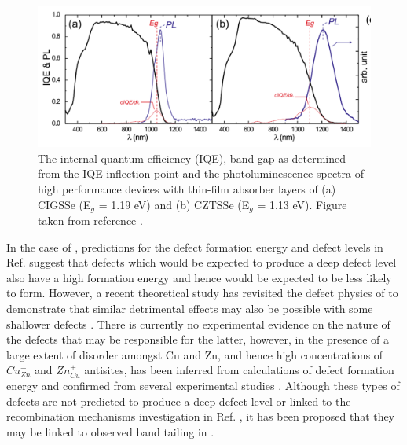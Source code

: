 \documentclass[11pt, twoside]{report}
\begin{document}
\begin{figure}[h!]
  \centering
    \includegraphics[width=1.0\textwidth]{figures/CZTS+CIGS_PL.png}
    \caption[The internal quantum efficiency (IQE), band gap as determined from the IQE inflection point and the photoluminescence spectra of high performance devices with thin-film absorber layers of (a) CIGSSe (E$_g$ = 1.19 eV) and (b) CZTSSe (E$_g$ = 1.13 eV).]{The internal quantum efficiency (IQE), band gap as determined from the IQE inflection point and the photoluminescence spectra of high performance devices with thin-film absorber layers of (a) CIGSSe (E$_g$ = 1.19 eV) and (b) CZTSSe (E$_g$ = 1.13 eV). Figure taken from reference .}
  \label{CZTS+CIGS_PL}
\end{figure}

In the case of {\CZTS}, predictions for the defect formation energy and defect levels in Ref.  suggest that defects which would be expected to produce a deep defect level also have a high formation energy and hence would be expected to be less likely to form.
However, a recent theoretical study has revisited the defect physics of {\CZTS} to demonstrate that similar detrimental effects may also be possible with some shallower defects \cite{Sunghyun_killer_defects}.
There is currently no experimental evidence on the nature of the defects that may be responsible for the latter, however, in {\CZTS} the presence of a large extent of disorder amongst Cu and Zn, and hence high concentrations of $Cu_{Zn}^{-}$ and $Zn_{Cu}^{+}$ antisites, has been inferred from calculations of defect formation energy \cite{defects_Chen} and confirmed from several experimental studies \cite{Schorr, CZTS_Xray, CZTS_TEM}. Although these types of defects are not predicted to produce a deep defect level or linked to the recombination mechanisms investigation in Ref. , it has been proposed that they may be linked to observed band tailing in {\CZTS} \cite{band_tail}.
\end{document}
